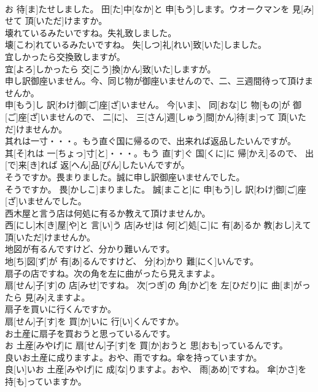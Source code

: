 \documentclass[8pt]{extreport}
\begin{document}
\begin{CJK}{UTF8}{min}
\\	お 待[ま]たせしました。 田[た]中[なか]と 申[もう]します。ウオークマンを 見[み]せて 頂[いただ]けますか。
\\	壊れているみたいですね。失礼致しました。	
\\	壊[こわ]れているみたいですね。 失[しつ]礼[れい]致[いた]しました。
\\	宜しかったら交換致しますが。	
\\	宜[よろ]しかったら 交[こう]換[かん]致[いた]しますが。
\\	申し訳御座いません。今、同じ物が御座いませんので、二、三週間待って頂けませんか。	
\\	申[もう]し 訳[わけ]御[ご]座[ざ]いません。 今[いま]、 同[おな]じ 物[もの]が 御[ご]座[ざ]いませんので、 二[に]、 三[さん]週[しゅう]間[かん]待[ま]って 頂[いただ]けませんか。
\\	其れは一寸・・・。もう直ぐ国に帰るので、出来れば返品したいんですが。	
\\	其[そ]れは 一[ちょっ]寸[と]・・・。もう 直[す]ぐ 国[くに]に 帰[かえ]るので、 出[で]来[き]れば 返[へん]品[ぴん]したいんですが。
\\	そうですか。畏まりました。誠に申し訳御座いませんでした。	
\\	そうですか。 畏[かしこ]まりました。 誠[まこと]に 申[もう]し 訳[わけ]御[ご]座[ざ]いませんでした。
\\	西木屋と言う店は何処に有るか教えて頂けませんか。	
\\	西[にし]木[き]屋[や]と 言[い]う 店[みせ]は 何[ど]処[こ]に 有[あ]るか 教[おし]えて 頂[いただ]けませんか。
\\	地図が有るんですけど、分かり難いんです。	
\\	地[ち]図[ず]が 有[あ]るんですけど、 分[わ]かり 難[にく]いんです。
\\	扇子の店ですね。次の角を左に曲がったら見えますよ。	
\\	扇[せん]子[す]の 店[みせ]ですね。 次[つぎ]の 角[かど]を 左[ひだり]に 曲[ま]がったら 見[み]えますよ。
\\	扇子を買いに行くんですか。	
\\	扇[せん]子[す]を 買[か]いに 行[い]くんですか。
\\	お土産に扇子を買おうと思っているんです。	
\\	お 土産[みやげ]に 扇[せん]子[す]を 買[か]おうと 思[おも]っているんです。
\\	良いお土産に成りますよ。おや、雨ですね。傘を持っていますか。	
\\	良[い]いお 土産[みやげ]に 成[な]りますよ。おや、 雨[あめ]ですね。 傘[かさ]を 持[も]っていますか。

\end{CJK}
\end{document}
